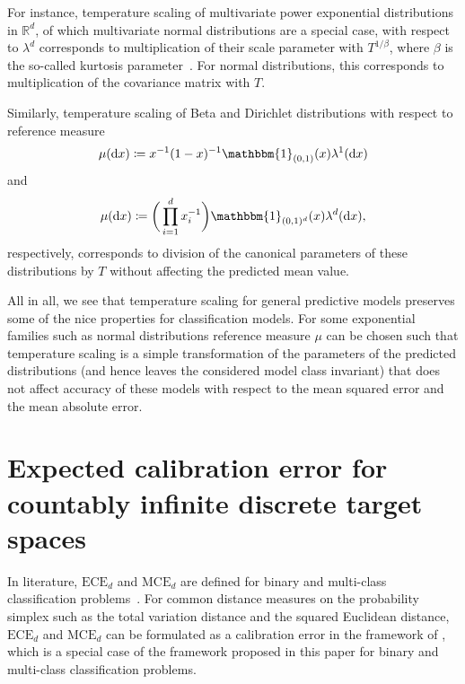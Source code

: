 \documentclass{article}
\begin{document}
For instance, temperature scaling of multivariate power exponential
distributions~\citep{Gomez1998} in $\mathbb{R}^d$,
of which multivariate normal distributions are a special case, with
respect to $\lambda^d$ corresponds to multiplication of their
scale parameter with $T^{1/\beta}$, where $\beta$ is the
so-called kurtosis parameter~\citep{GomezSanchezManzano2008}.
For normal distributions, this corresponds to multiplication
of the covariance matrix with $T$.

Similarly, temperature scaling of Beta and Dirichlet distributions
with respect to reference measure
\begin{equation*}
    \mu(\mathrm{d}x) \coloneqq x^{-1} (1-x)^{-1} \mathbbm{1}_{(0,1)}(x) \lambda^1(\mathrm{d}x)
\end{equation*}
and
\begin{equation*}
    \mu(\mathrm{d}x) \coloneqq \bigg(\prod_{i=1}^d x_i^{-1}\bigg) \mathbbm{1}_{(0,1)^d}(x) \lambda^d(\mathrm{d}x),
\end{equation*}
respectively, corresponds to division of the canonical parameters of these
distributions by $T$ without affecting the predicted mean value.

All in all, we see that temperature scaling for general
predictive models preserves some of the nice properties for classification
models. For some exponential families such as normal
distributions reference measure $\mu$ can be chosen such that temperature
scaling is a simple transformation of the parameters of the predicted
distributions (and hence leaves the considered model class invariant) that
does not affect accuracy of these models with respect to the mean squared error
and the mean absolute error.

\section{Expected calibration error for countably infinite discrete target spaces}
\label{app:ece_infinite}

In literature, $\mathrm{ECE}_d$ and $\mathrm{MCE}_d$ are defined for binary and multi-class
classification problems~\citep{Vaicenavicius2019,Guo2017,Naeini2015}. For common distance measures
on the probability simplex such as the total variation distance and the squared Euclidean distance,
$\mathrm{ECE}_d$ and $\mathrm{MCE}_d$ can be formulated as a calibration error in the framework of
\citet{Widmann2019}, which is a special case of the framework proposed in this paper for binary and
multi-class classification problems.
\end{document}

